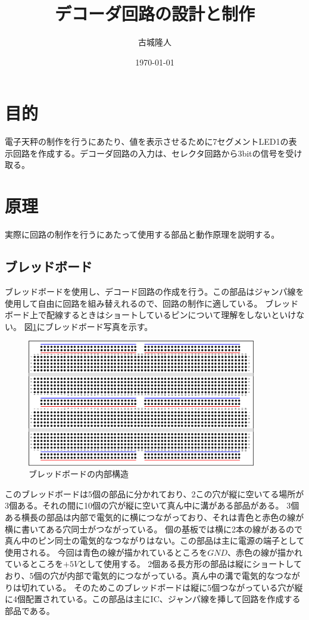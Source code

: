 \documentclass[a4paper,11pt,dvipdfmx]{jsarticle}
\begin{document}
\title{デコーダ回路の設計と制作}
\author{古城隆人}
\date{\today}
\maketitle

\newpage
\section{目的}
電子天秤の制作を行うにあたり、値を表示させるために7セグメントLED1の表示回路を作成する。デコーダ回路の入力は、セレクタ回路から3bitの信号を受け取る。
\section{原理}
実際に回路の制作を行うにあたって使用する部品と動作原理を説明する。
\subsection{ブレッドボード}
ブレッドボードを使用し、デコード回路の作成を行う。この部品はジャンパ線を使用して自由に回路を組み替えれるので、回路の制作に適している。
ブレッドボード上で配線するときはショートしているピンについて理解をしないといけない。
図\ref{fig:breadboard}にブレッドボード写真を示す。
\begin{figure}[h]
  \centering
  \includegraphics[width=10cm]{./images/breadboard.drawio.png}
  \caption{ブレッドボードの内部構造}
  \label{fig:breadboard}
\end{figure}
このブレッドボードは5個の部品に分かれており、2この穴が縦に空いてる場所が3個ある。それの間に10個の穴が縦に空いて真ん中に溝がある部品がある。
3個ある横長の部品は内部で電気的に横につながっており、それは青色と赤色の線が横に書いてある穴同士がつながっている。
個の基板では横に2本の線があるので真ん中のピン同士の電気的なつながりはない。この部品は主に電源の端子として使用される。
今回は青色の線が描かれているところを$GND$、赤色の線が描かれているところを$+5V$として使用する。
2個ある長方形の部品は縦にショートしており、5個の穴が内部で電気的につながっている。真ん中の溝で電気的なつながりは切れている。
そのためこのブレッドボードは縦に5個つながっている穴が縦に4個配置されている。この部品は主にIC、ジャンパ線を挿して回路を作成する部品である。
\end{document}
